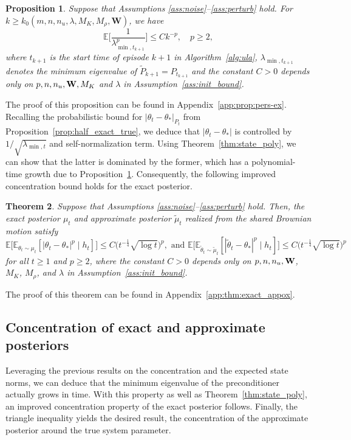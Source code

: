 \documentclass[11pt]{article}
\theoremstyle{plain}
\newtheorem{thm}{Theorem}[section]
\newtheorem{prop}[thm]{Proposition}
\theoremstyle{definition}
\theoremstyle{remark}
\begin{document}
\begin{prop}\label{prop:pers-ex}
Suppose that Assumptions \ref{ass:noise}--\ref{ass:perturb} hold. For  $k\geq k_0(m,n,n_u,\lambda,M_K,M_\rho,\mathbf{W})$, we have
\[
\mathbb{E}\bigg[\frac{1}{\lambda_{\min,t_{k+1}}^p}\bigg] \leq C k^{-p}, \quad p\geq 2,\] where $t_{k+1}$ is the start time of episode $k+1$ in Algorithm~\ref{alg:ula}, 
$\lambda_{\min, t_{k+1}}$ denotes the minimum eigenvalue of $\tilde{P}_{k+1} = P_{t_{k+1}}$ and the constant $C > 0$ depends only on $p, n, n_u, \bold{W}, M_K$ and $\lambda$  in Assumption~\ref{ass:init_bound}.
\end{prop}

The proof of this proposition can be found in Appendix~\ref{app:prop:pers-ex}.
Recalling the probabilistic bound for $|\theta_t - \theta_*|_{P_t}$ from Proposition~\ref{prop:half_exact_true}, 
we deduce that 
$|\theta_t - \theta_* |$ is controlled by  $1/\sqrt{\lambda_{\min,t}}$ and self-normalization term.
Using Theorem~\ref{thm:state_poly}, we can show that the latter is dominated by the former, which has a polynomial-time growth due to Proposition~\ref{prop:pers-ex}. 
Consequently, the following improved concentration bound holds for the exact posterior.

\begin{thm}\label{thm:exact_appox}
Suppose that Assumptions \ref{ass:noise}--\ref{ass:perturb} hold. Then, the exact posterior $\mu_{t}$ and approximate posterior $\tilde \mu_t$ realized from the shared Brownian motion satisfy
\[
\mathbb{E}\big [\mathbb{E}_{\theta_t \sim \mu_{t}}[|\theta_t-\theta_*|^p \mid h_{t}] \big ] \leq C\Big(t^{-\frac{1}{4}}\sqrt{\log t}\Big)^p, \mbox{ and }
\mathbb{E}\big[\mathbb{E}_{\tilde{\theta}_t \sim \tilde{\mu}_t}[| \tilde{\theta}_t - \theta_* |^p \mid h_{t} ]\big] \leq C\Big(t^{-\frac{1}{4}}\sqrt{\log t}\Big)^p
\] 
for all $t\geq 1$ and $p\geq 2$, where  the constant $C > 0$ depends only on $p, n, n_u, \bold{W}$, $M_K$, $M_\rho$, and $\lambda$  in Assumption~\ref{ass:init_bound}.
\end{thm}

The proof of this theorem can be found in Appendix~\ref{app:thm:exact_appox}.


\subsection{Concentration of exact and approximate posteriors}


Leveraging the previous results on the concentration and the expected state norms, we can deduce that the minimum eigenvalue of the preconditioner actually grows in time. 
With this property as well as Theorem~\ref{thm:state_poly}, an improved concentration property of the exact posterior follows. Finally, the triangle inequality yields the desired result, the concentration of the approximate posterior around the true system parameter.
\end{document}
